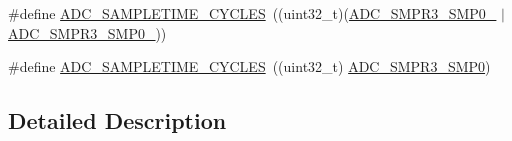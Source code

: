 \begin{DoxyCompactItemize}
\item 
\#define \hyperlink{group___a_d_c__sampling__times_gad34264d2d4e3f4b80efab27e7b7a91cd}{A\-D\-C\-\_\-\-S\-A\-M\-P\-L\-E\-T\-I\-M\-E\-\_\-C\-Y\-C\-L\-E\-S}~((uint32\-\_\-t)(\hyperlink{group___peripheral___registers___bits___definition_gab186002e7254bf71029ad9486b2f4cfd}{A\-D\-C\-\_\-\-S\-M\-P\-R3\-\_\-\-S\-M\-P0\-\_} $\vert$ \hyperlink{group___peripheral___registers___bits___definition_gac3c009d8ba490ce850028b7bff9c5a8f}{A\-D\-C\-\_\-\-S\-M\-P\-R3\-\_\-\-S\-M\-P0\-\_}))
\item 
\#define \hyperlink{group___a_d_c__sampling__times_ga8e38926a620e1c84dab31f7fa5dfb11d}{A\-D\-C\-\_\-\-S\-A\-M\-P\-L\-E\-T\-I\-M\-E\-\_\-C\-Y\-C\-L\-E\-S}~((uint32\-\_\-t) \hyperlink{group___peripheral___registers___bits___definition_ga89f3fbb1bb3c2690c536209f4e9d35cd}{A\-D\-C\-\_\-\-S\-M\-P\-R3\-\_\-\-S\-M\-P0})
\end{DoxyCompactItemize}


\subsection{Detailed Description}


